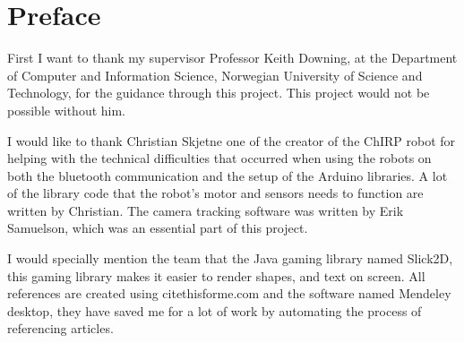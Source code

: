 \clearpage

\section*{Preface}



\vspace{1cm}

First I want to thank my supervisor Professor Keith Downing, at the Department of Computer and Information Science, Norwegian University of Science and Technology, for the guidance through this project. This project would not be possible without him.

I would like to thank Christian Skjetne one of the creator of the ChIRP robot for helping with the technical difficulties that occurred when using the robots on both the bluetooth communication and the setup of the Arduino libraries. A lot of the library code that the robot's motor and sensors needs to function are written by Christian. The camera tracking software was written by Erik Samuelson, which was an essential part of this project.

I would specially mention the team that the Java gaming library named Slick2D, this gaming library makes it easier to render shapes, and text on screen.
All references are created using citethisforme.com and the software named Mendeley desktop, they have saved me for a lot of work by automating the process of referencing articles.
